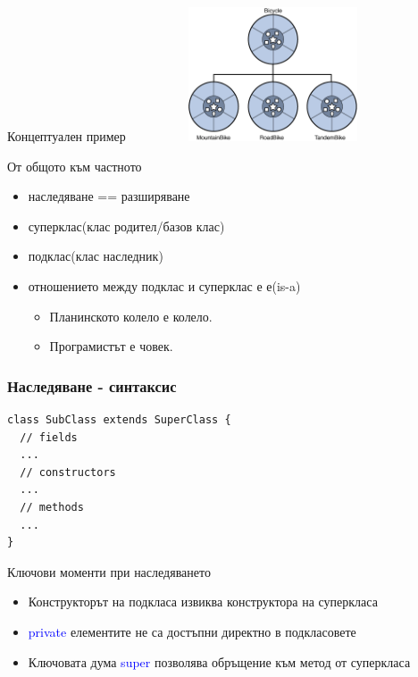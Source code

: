 \documentclass{beamer}
\begin{document}
\begin{frame}{Концептуален пример}
  \transdissolve
  \includegraphics[width=320px, height=150px]{images/concepts-inheritance.png}  
\end{frame}

\begin{frame}{От общото към частното}
  \transdissolve
  \begin{itemize}
  \item наследяване == разширяване
  \item суперклас(клас родител/базов клас)
  \item подклас(клас наследник)
  \item отношението между подклас и суперклас е е(is-a)
    \begin{itemize}
      \item Планинското колело е колело.
      \item Програмистът е човек.
    \end{itemize}
  \end{itemize}
\end{frame}

\begin{frame}[fragile]
  \frametitle{Наследяване - синтаксис}
  \transdissolve
\begin{lstlisting}
class SubClass extends SuperClass {
  // fields
  ...
  // constructors
  ...
  // methods
  ...
}
\end{lstlisting}
\end{frame}

\begin{frame}{Ключови моменти при наследяването}
  \transdissolve
  \begin{itemize}
  \item Конструкторът на подкласа извиква конструктора на суперкласа
  \item \textcolor{blue}{private} елементите не са достъпни директно в подкласовете
  \item Ключовата дума \textcolor{blue}{super} позволява обръщение към метод от
    суперкласа
  \end{itemize}
\end{frame}
\end{document}
